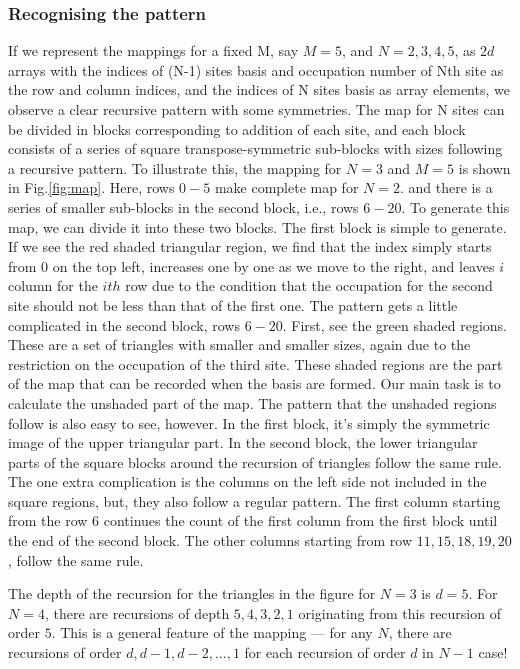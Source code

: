 \documentclass[final,twocolumn]{elsarticle}
\begin{document}
\begin{small}
\subsubsection{Recognising the pattern}
If we represent the mappings for a fixed M, say $M=5$, and $N=2,3,4,5$,
as $2d$ arrays with
the indices of (N-1) sites basis 
and occupation number of Nth site as the
 row and column indices, and the indices of N sites basis as array elements,
we observe a clear recursive pattern with some symmetries. 
The map for N sites can be divided in blocks corresponding to addition of each site,
and each block consists of a series of square transpose-symmetric sub-blocks
 with sizes following a recursive pattern. 
To illustrate this, the mapping for $N=3$ and $M=5$ is shown in Fig.\ref{fig:map}. %
Here, rows $0-5$ make complete map for $N=2$.
 and there is a series of smaller sub-blocks in the second block, i.e., rows $6-20$.
To generate this map, we can divide it into these two blocks. 
The first block is simple to generate.
 If we see the red shaded triangular region, 
 we find that the index simply starts from 0 on the top left, 
 increases one by one as we move to the right, and leaves $i$ column for the $ith$ row
  due to the condition that the occupation for the second site should not be less than that of the first one.
The pattern gets a little complicated in the second block, rows $6-20$. First, see the green shaded regions.
These are a set of triangles with smaller and smaller sizes, 
again due to the restriction on the occupation of the third site.
These shaded regions are the part of the map that can be recorded when the basis are formed.
Our main task is to calculate the unshaded part of the map.
The pattern that the unshaded regions follow is also easy to see, however. 
In the first block, it's simply the symmetric image of the upper triangular part.
In the second block, 
the lower triangular parts of the square blocks around the recursion of triangles follow the same rule. 
The one extra complication is the columns on the left side not included in the square regions, but, 
they also follow a regular pattern. 
The first column starting from the row $6$ continues the count of the first column from the first block
 until the end of the second block.
 The other columns starting from row $11,15,18,19,20$, follow the same rule.

The depth of the recursion for the triangles in the figure for $N=3$ is $d=5$.
For $N=4$, there are recursions of depth $5,4,3,2,1$ originating from this recursion of order $5$.
This is a general feature of the mapping --- for any $N$, there are recursions of order $d,d-1,d-2,...,1$
 for each recursion of order $d$ in $N-1$ case!
 





\end{small}
\end{document}
